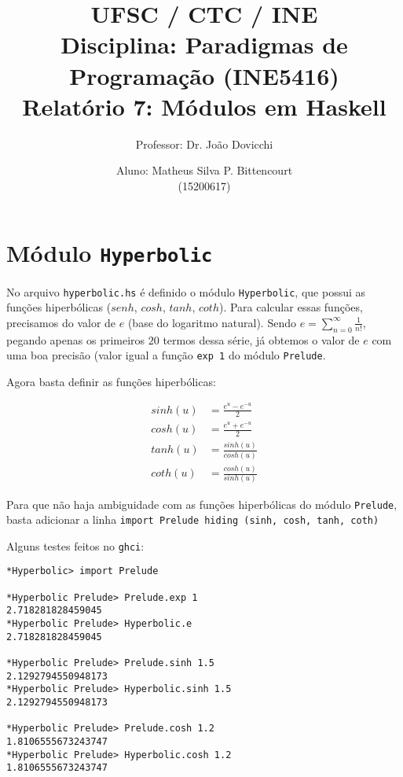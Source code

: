 \documentclass[a4paper,twocolumn,10pt]{article}
\begin{document}
\title{
	\large \rm UFSC / CTC / INE\\
	\large \rm Disciplina: Paradigmas de Programação (INE5416)\\
	\Large \bf Relatório 7: Módulos em Haskell
}

\author{
	Professor: Dr. João Dovicchi\\
	\and
	Aluno: Matheus Silva P. Bittencourt\\(15200617)
}

\maketitle

\thispagestyle{empty} %

\section*{Módulo \texttt{Hyperbolic}}

No arquivo \texttt{hyperbolic.hs} é definido o módulo \texttt{Hyperbolic}, que
possui as funções hiperbólicas ($senh$, $cosh$, $tanh$, $coth$). Para calcular
essas funções, precisamos do valor de $e$ (base do logaritmo natural).  Sendo
$e = \sum_{n=0}^{\infty} \frac{1}{n!}$, pegando apenas os primeiros $20$ termos
dessa série, já obtemos o valor de $e$ com uma boa precisão (valor igual a
função \texttt{exp 1} do módulo \texttt{Prelude}.

Agora basta definir as funções hiperbólicas:

\begin{align*}
	sinh(u) &= \frac{e^u - e ^{-u}}{2} \\
	cosh(u) &= \frac{e^u + e ^{-u}}{2} \\
	tanh(u) &= \frac{sinh(u)}{cosh(u)} \\
	coth(u) &= \frac{cosh(u)}{sinh(u)}
\end{align*}

Para que não haja ambiguidade com as funções hiperbólicas do módulo
\texttt{Prelude}, basta adicionar a linha \texttt{import Prelude hiding (sinh,
cosh, tanh, coth)}

Alguns testes feitos no \texttt{ghci}:

\begin{verbatim}
*Hyperbolic> import Prelude

*Hyperbolic Prelude> Prelude.exp 1
2.718281828459045
*Hyperbolic Prelude> Hyperbolic.e
2.718281828459045

*Hyperbolic Prelude> Prelude.sinh 1.5
2.1292794550948173
*Hyperbolic Prelude> Hyperbolic.sinh 1.5
2.1292794550948173

*Hyperbolic Prelude> Prelude.cosh 1.2
1.8106555673243747
*Hyperbolic Prelude> Hyperbolic.cosh 1.2
1.8106555673243747
\end{verbatim}
\end{document}
